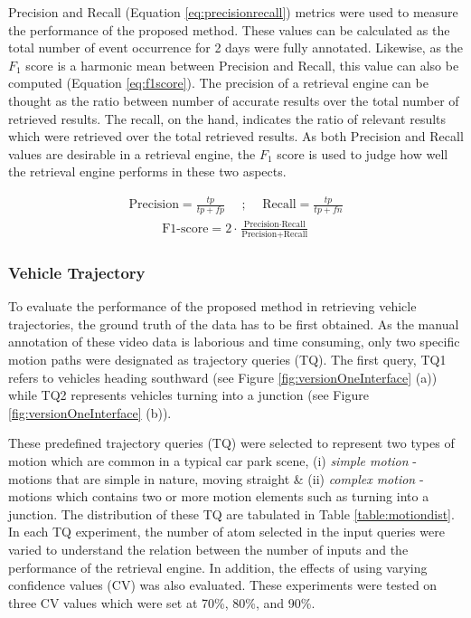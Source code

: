 Precision and Recall (Equation \ref{eq:precisionrecall}) metrics were used to measure the performance of the proposed method. These values can be calculated as the total number of event occurrence for 2 days were fully annotated. Likewise, as the $F_1$ score is a harmonic mean between Precision and Recall, this value can also be computed (Equation \ref{eq:f1score}). The precision of a retrieval engine can be thought as the ratio between number of accurate results over the total number of retrieved results. The recall, on the hand, indicates the ratio of relevant results which were retrieved over the total retrieved results. As both Precision and Recall values are desirable in a retrieval engine, the $F_1$ score is used to judge how well the retrieval engine performs in these two aspects.

\begin{align}
\label{eq:precisionrecall}
    \text{Precision} = \frac{tp}{tp + fp}   \hspace{1em} \text{ ; }  \hspace{1em} \text{Recall}  = \frac{tp}{tp + fn}
\end{align}
\begin{align}
\label{eq:f1score}
\text{F1-score}  = 2\cdot\frac{\text{Precision} \cdot \text{Recall}}{\text{Precision} + \text{Recall}}
\end{align}


\subsubsection{Vehicle Trajectory}

To evaluate the performance of the proposed method in retrieving vehicle trajectories, the ground truth of the data has to be first obtained. As the manual annotation of these video data is laborious and time consuming, only two specific motion paths were designated as trajectory queries (TQ). The first query, TQ1 refers to vehicles heading southward (see Figure \ref{fig:versionOneInterface} (a)) while TQ2 represents vehicles turning into a junction (see Figure \ref{fig:versionOneInterface} (b)).

These predefined trajectory queries (TQ) were selected to represent two types of motion which are common in a typical car park scene, (i) \textit{simple motion} - motions that are simple in nature, moving straight \& (ii) \textit{complex motion} - motions which contains two or more motion elements such as turning into a junction. The distribution of these TQ are tabulated in Table \ref{table:motiondist}. In each TQ experiment, the number of atom selected in the input queries were varied to understand the relation between the number of inputs and the performance of the retrieval engine. In addition, the effects of using varying confidence values (CV) was also evaluated. These experiments were tested on three CV values which were set at 70\%, 80\%, and 90\%.


